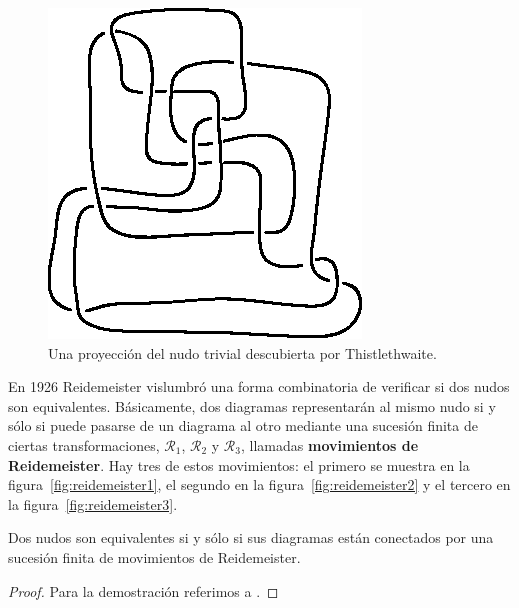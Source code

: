 \documentclass[graybox]{svmult}
\begin{document}
	\begin{figure}
    	\centering
		\includegraphics[scale=0.6]{images/thistlethwaite}
        \caption{Una proyección del nudo trivial descubierta por Thistlethwaite.}
        \label{fig:thistlethwaite}
    \end{figure}



    \label{block:reidemeister}
		En 1926 Reidemeister vislumbró una forma combinatoria de verificar si dos
		nudos son equivalentes. Básicamente, dos diagramas representarán al mismo
		nudo si y sólo si puede pasarse de un diagrama al otro mediante una
		sucesión finita de ciertas transformaciones, $\mathcal{R}_1$,
        $\mathcal{R}_2$ y $\mathcal{R}_3$, llamadas \textbf{movimientos de
		Reidemeister}.  Hay tres de estos movimientos:  el primero se muestra en la
		figura~\ref{fig:reidemeister1}, el segundo en la
		figura~\ref{fig:reidemeister2} y el tercero en la
		figura~\ref{fig:reidemeister3}. 

\begin{theorem}[Reidemeister]
	Dos nudos son equivalentes si y sólo si sus diagramas están conectados
	por una sucesión finita de movimientos de Reidemeister.
\end{theorem}

\begin{proof}
	Para la demostración referimos a \cite[1.14]{MR3156509}.
\end{proof}
\end{document}

